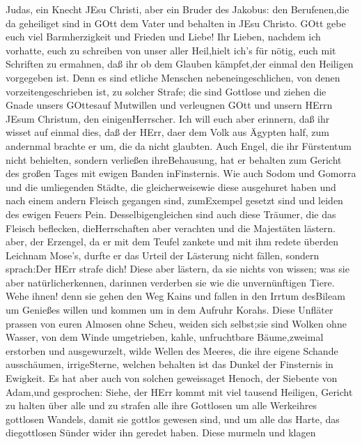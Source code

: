  Judas, ein Knecht JEsu Christi, aber ein Bruder des
Jakobus: den Berufenen,die da geheiliget sind in GOtt dem Vater und
behalten in JEsu Christo.  GOtt gebe euch viel
Barmherzigkeit und Frieden und Liebe!  Ihr Lieben, nachdem
ich vorhatte, euch zu schreiben von unser aller Heil,hielt ich's für
nötig, euch mit Schriften zu ermahnen, daß ihr ob dem Glauben
kämpfet,der einmal den Heiligen vorgegeben ist.  Denn es
sind etliche Menschen nebeneingeschlichen, von denen
vorzeitengeschrieben ist, zu solcher Strafe; die sind Gottlose und
ziehen die Gnade unsers GOttesauf Mutwillen und verleugnen GOtt und
unsern HErrn JEsum Christum, den einigenHerrscher.  Ich will
euch aber erinnern, daß ihr wisset auf einmal dies, daß der HErr, daer
dem Volk aus Ägypten half, zum andernmal brachte er um, die da nicht
glaubten.  Auch Engel, die ihr Fürstentum nicht behielten,
sondern verließen ihreBehausung, hat er behalten zum Gericht des großen
Tages mit ewigen Banden inFinsternis.  Wie auch Sodom und
Gomorra und die umliegenden Städte, die gleicherweisewie diese
ausgehuret haben und nach einem andern Fleisch gegangen sind, zumExempel
gesetzt sind und leiden des ewigen Feuers Pein. 
Desselbigengleichen sind auch diese Träumer, die das Fleisch beflecken,
dieHerrschaften aber verachten und die Majestäten lästern. 
aber, der Erzengel, da er mit dem Teufel zankete und mit ihm redete
überden Leichnam Mose's, durfte er das Urteil der Lästerung nicht
fällen, sondern sprach:Der HErr strafe dich!  Diese aber
lästern, da sie nichts von wissen; was sie aber natürlicherkennen,
darinnen verderben sie wie die unvernünftigen Tiere.  Wehe
ihnen! denn sie gehen den Weg Kains und fallen in den Irrtum desBileam
um Genießes willen und kommen um in dem Aufruhr Korahs. 
Diese Unfläter prassen von euren Almosen ohne Scheu, weiden sich
selbst;sie sind Wolken ohne Wasser, von dem Winde umgetrieben, kahle,
unfruchtbare Bäume,zweimal erstorben und ausgewurzelt, 
wilde Wellen des Meeres, die ihre eigene Schande ausschäumen,
irrigeSterne, welchen behalten ist das Dunkel der Finsternis in
Ewigkeit.  Es hat aber auch von solchen geweissaget Henoch,
der Siebente von Adam,und gesprochen: Siehe, der HErr kommt mit viel
tausend Heiligen,  Gericht zu halten über alle und zu
strafen alle ihre Gottlosen um alle Werkeihres gottlosen Wandels, damit
sie gottlos gewesen sind, und um alle das Harte, das diegottlosen Sünder
wider ihn geredet haben.  Diese murmeln und klagen
